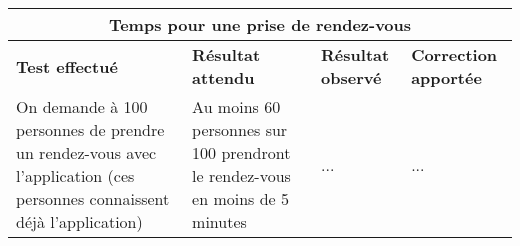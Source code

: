\documentclass{article}
\begin{document}
  \begin{center}
    \begin{tabular}{|p{4cm}|p{4cm}|p{4cm}|p{4cm}|}
      \hline
      \multicolumn{4}{|c|}{\textbf{Temps pour une prise de rendez-vous}} \\
      \hline
      \textbf{Test effectué} & \textbf{Résultat attendu} & \textbf{Résultat observé}  & \textbf{Correction apportée}\\
      \hline

      On demande à 100 personnes de prendre un rendez-vous avec l'application (ces personnes connaissent déjà l'application)&
      Au moins 60 personnes sur 100 prendront le rendez-vous en moins de 5 minutes&
      ...&
      ... \\


      \hline

    \end{tabular}
  \end{center}



  
\end{document}
